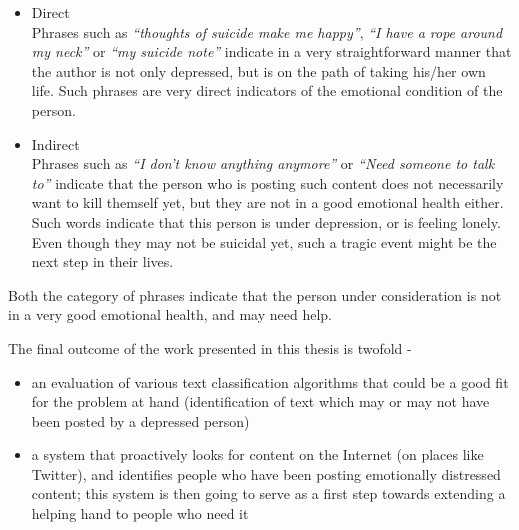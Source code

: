 \begin{itemize}
    \item{
    Direct\\
    Phrases such as \emph{``thoughts of suicide make me happy''}, \emph{``I have a rope around my neck''} or \emph{``my suicide note''} indicate in a very straightforward manner that the author is not only depressed, but is on the path of taking his/her own life. Such phrases are very direct indicators of the emotional condition of the person.
    }
    \item{
    Indirect\\
    Phrases such as \emph{``I don't know anything anymore''} or \emph{``Need someone to talk to''} indicate that the person who is posting such content does not necessarily want to kill themself yet, but they are not in a good emotional health either. Such words indicate that this person is under depression, or is feeling lonely. Even though they may not be suicidal yet, such a tragic event might be the next step in their lives. 
    }
\end{itemize}

Both the category of phrases indicate that the person under consideration is not in a very good emotional health, and may need help.

The final outcome of the work presented in this thesis is twofold -
\begin{itemize}
    \item{an evaluation of various text classification algorithms that could be a good fit for the problem at hand (identification of text which may or may not have been posted by a depressed person)}
    \item{a system that proactively looks for content on the Internet (on places like Twitter), and identifies people who have been posting emotionally distressed content; this system is then going to serve as a first step towards extending a helping hand to people who need it}
\end{itemize}
